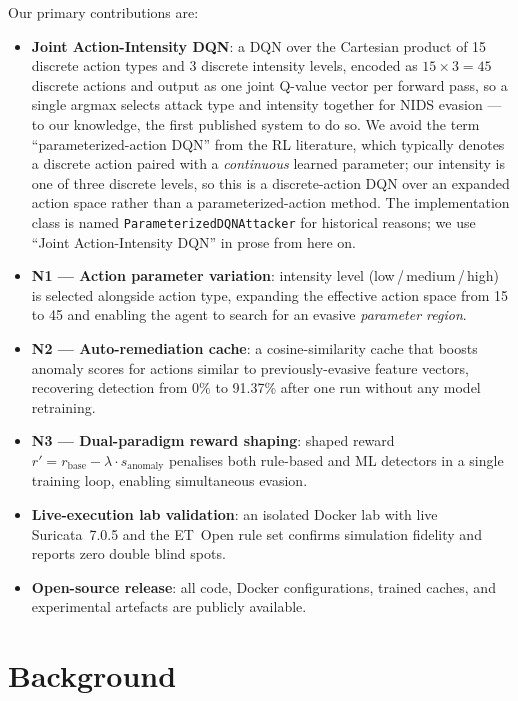 \documentclass[sigconf]{acmart}
\begin{document}
Our primary contributions are:
\begin{itemize}
  \item \textbf{Joint Action-Intensity DQN}: a DQN over the Cartesian
    product of 15 discrete action types and 3 discrete intensity levels,
    encoded as $15 \times 3 = 45$ discrete actions and output as one
    joint Q-value vector per forward pass, so a single argmax selects
    attack type and intensity together for NIDS evasion --- to our
    knowledge, the first published system to do so. We avoid the term
    ``parameterized-action DQN'' from the RL literature, which typically
    denotes a discrete action paired with a \emph{continuous} learned
    parameter; our intensity is one of three discrete levels, so this is
    a discrete-action DQN over an expanded action space rather than a
    parameterized-action method. The implementation class is named
    \texttt{ParameterizedDQNAttacker} for historical reasons; we use
    ``Joint Action-Intensity DQN'' in prose from here on.
  \item \textbf{N1 --- Action parameter variation}: intensity level
    (low\,/\,medium\,/\,high) is selected alongside action type,
    expanding the effective action space from 15 to 45 and enabling
    the agent to search for an evasive \emph{parameter region}.
  \item \textbf{N2 --- Auto-remediation cache}: a cosine-similarity
    cache that boosts anomaly scores for actions similar to previously-evasive
    feature vectors, recovering detection from 0\% to 91.37\% after one
    run without any model retraining.
  \item \textbf{N3 --- Dual-paradigm reward shaping}: shaped reward
    $r' = r_{\text{base}} - \lambda \cdot s_{\text{anomaly}}$ penalises
    both rule-based and ML detectors in a single training loop, enabling
    simultaneous evasion.
  \item \textbf{Live-execution lab validation}: an isolated Docker lab
    with live Suricata~7.0.5 and the ET~Open rule set confirms simulation
    fidelity and reports zero double blind spots.
  \item \textbf{Open-source release}: all code, Docker configurations,
    trained caches, and experimental artefacts are publicly available.
\end{itemize}

\section{Background}
\label{sec:background}
\end{document}
